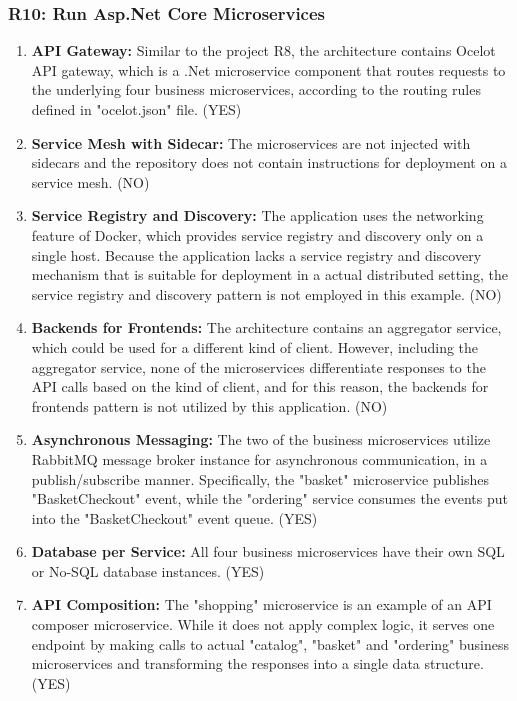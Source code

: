 \documentclass{Configuration_Files/PoliMi3i_thesis}
\begin{document}
\subsubsection{R10: Run Asp.Net Core Microservices}
\label{subsubsec:R10}

\begin{enumerate}
    \item \textbf{API Gateway:} Similar to the project R8, the architecture contains Ocelot API gateway, which is a .Net microservice component that routes requests to the underlying four business microservices, according to the routing rules defined in "ocelot.json" file. (YES)
    
    \item \textbf{Service Mesh with Sidecar:} The microservices are not injected with sidecars and the repository does not contain instructions for deployment on a service mesh. (NO)
    
    \item \textbf{Service Registry and Discovery:} The application uses the networking feature of Docker, which provides service registry and discovery only on a single host.
    Because the application lacks a service registry and discovery mechanism that is suitable for deployment in a actual distributed setting, the service registry and discovery pattern is not employed in this example. (NO)
    
    \item \textbf{Backends for Frontends:} The architecture contains an aggregator service, which could be used for a different kind of client.
    However, including the aggregator service, none of the microservices differentiate responses to the API calls based on the kind of client, and for this reason, the backends for frontends pattern is not utilized by this application. (NO)
    
    \item \textbf{Asynchronous Messaging:} The two of the business microservices utilize RabbitMQ message broker instance for asynchronous communication, in a publish/subscribe manner.
    Specifically, the "basket" microservice publishes "BasketCheckout" event, while the "ordering" service consumes the events put into the "BasketCheckout" event queue. (YES)
    
    \item \textbf{Database per Service:} All four business microservices have their own SQL or No-SQL database instances. (YES)
    
    \item \textbf{API Composition:} The "shopping" microservice is an example of an API composer microservice.
    While it does not apply complex logic, it serves one endpoint by making calls to actual "catalog", "basket" and "ordering" business microservices and transforming the responses into a single data structure. (YES)
    

\end{enumerate}
\end{document}

